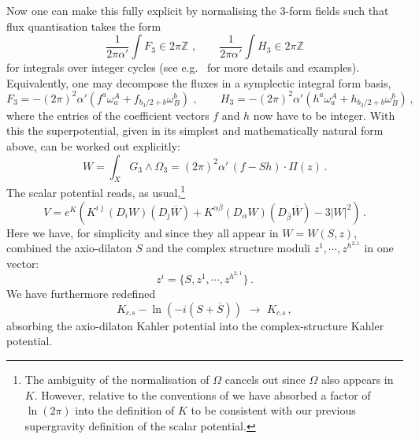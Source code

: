 \documentclass[12pt]{article}
\newcommand{\be}{\begin{equation}}
\newcommand{\ee}{\end{equation}}
\newcommand{\ol}{\overline}
\numberwithin{equation}{section}
\begin{document}
Now one can make this fully explicit by normalising the 3-form fields such that flux quantisation takes the form
\be
\frac{1}{2\pi\alpha'}\int F_3\in 2\pi\mathbb{Z}\,\,,\qquad 
\frac{1}{2\pi\alpha'}\int H_3\in 2\pi\mathbb{Z}
\ee
for integrals over integer cycles (see e.g.~\cite{Giryavets:2005nf} for more details and examples). Equivalently, one may decompose the fluxes in a symplectic integral form basis,
\be
F_3=-(2\pi)^2\alpha'(f^a\omega^A_a+f_{b_3/2+b}\omega_B^b)\,\,,\qquad
H_3=-(2\pi)^2\alpha'(h^a\omega^A_a+h_{b_3/2+b}\omega_B^b)\,,
\ee
where the entries of the coefficient vectors $f$ and $h$ now have to be integer. With this the superpotential, given in its simplest and mathematically natural form above, can be worked out explicitly:
\be
W=\int_X G_3\wedge \Omega_3=(2\pi)^2\alpha'\,(f-Sh)\cdot\Pi(z)\,.
\ee
The scalar potential reads, as usual,\footnote{
The 
ambiguity of the normalisation of $\Omega$ cancels out since $\Omega$ also appears in $K$. However, relative to the conventions of \cite{Giddings:2001yu} we have absorbed a factor of $\ln(2\pi)$ into the definition of $K$ to be consistent with our previous supergravity definition of the scalar potential.
}
\be
V=e^K \left( K^{i\ol{\jmath}}(D_i W)(D_{\ol{\jmath}}\ol{W})
+ K^{\alpha\ol{\beta}}(D_\alpha W)(D_{\ol{\beta}}\ol{W}) - 3|W|^2\right)\,.
\label{spot}
\ee
Here we have, for simplicity and since they all appear in $W=W(S,z)$, combined the axio-dilaton $S$ and the complex structure moduli $z^1,\cdots,z^{h^{2,1}}$ in one vector:
\be
z^i=\{S,z^1,\cdots,z^{h^{2,1}}\}\,.
\ee
We have furthermore redefined
\be
K_{c.s}-\ln(-i(S+\ol{S}))\,\,\to\,\,K_{c.s}\,,
\ee
absorbing the axio-dilaton Kahler potential into the complex-structure Kahler potential. 
\end{document}
